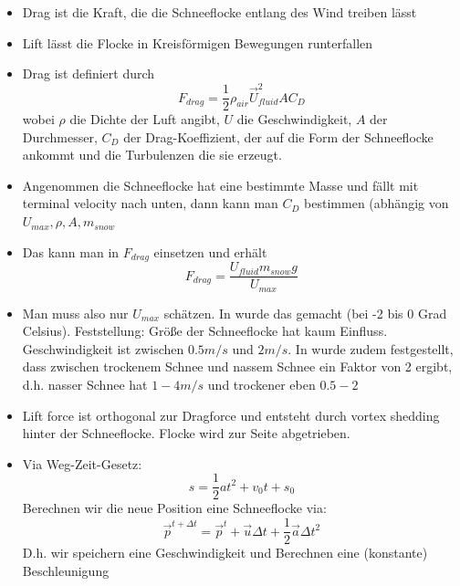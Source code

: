 \begin{itemize}
\item Drag ist die Kraft, die die Schneeflocke entlang des Wind treiben lässt
\item Lift lässt die Flocke in Kreisförmigen Bewegungen runterfallen
\item Drag ist definiert durch
\[
F_{drag} = \frac{1}{2} \rho_{air} \vec{U}_{fluid}^2 A C_D
\]
wobei $\rho$ die Dichte der Luft angibt, $U$ die
Geschwindigkeit, $A$ der Durchmesser, $C_D$ der Drag-Koeffizient, der auf die
Form der Schneeflocke ankommt und die Turbulenzen die sie erzeugt.
\item Angenommen die Schneeflocke hat eine bestimmte Masse und fällt mit
terminal velocity nach unten, dann kann man $C_D$ bestimmen (abhängig von $U_{max}, \rho, A, m_{snow}$
\item Das kann man in $F_{drag}$ einsetzen und erhält
\[
F_{drag} = \frac{U_{fluid} m_{snow} g}{U_{max}}
\]
\item Man muss also nur $U_{max}$ schätzen. In \cite{Hanesch1966} wurde das
gemacht (bei -2 bis 0 Grad Celsius). Feststellung: Größe der Schneeflocke hat
kaum Einfluss. Geschwindigkeit ist zwischen $0.5m/s$ und $2m/s$. In
\cite{Canada1999} wurde zudem festgestellt, dass zwischen trockenem Schnee und
nassem Schnee ein Faktor von 2 ergibt, d.h. nasser Schnee hat $1-4m/s$ und
trockener eben $0.5-2$
\item Lift force ist orthogonal zur Dragforce und entsteht durch vortex shedding
hinter der Schneeflocke. Flocke wird zur Seite abgetrieben.
\item Via Weg-Zeit-Gesetz:
\[
s=\frac{1}{2}at^2 + v_0 t + s_0
\]
Berechnen wir die neue Position eine Schneeflocke via:
\[
\vec{p}^{t+\Delta t} = \vec{p}^t + \vec{u} \Delta t + \frac{1}{2} \vec{a} \Delta t^2
\]
D.h. wir speichern eine Geschwindigkeit und Berechnen eine (konstante) Beschleunigung


\end{itemize}
